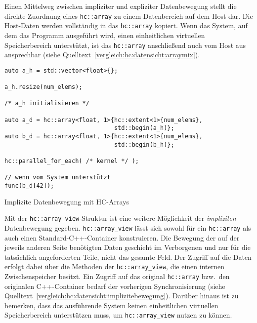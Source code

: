 Einen Mittelweg zwischen impliziter und expliziter Datenbewegung stellt die
direkte Zuordnung eines \texttt{hc::array} zu einem Datenbereich auf dem Host
dar. Die Host-Daten werden vollständig in das \texttt{hc::array} kopiert. Wenn
das System, auf dem das Programm ausgeführt wird, einen einheitlichen virtuellen
Speicherbereich unterstützt, ist das \texttt{hc::array} anschließend auch vom
Host aus ansprechbar (siehe Quelltext~\ref{vergleich:hc:datensicht:arraymix}).

\begin{code}
    \begin{verbatim}
auto a_h = std::vector<float>{};

a_h.resize(num_elems);

/* a_h initialisieren */

auto a_d = hc::array<float, 1>{hc::extent<1>{num_elems},
                               std::begin(a_h)};
auto b_d = hc::array<float, 1>{hc::extent<1>{num_elems},
                               std::begin(b_h)};

hc::parallel_for_each( /* kernel */ );

// wenn vom System unterstützt
func(b_d[42]);
    \end{verbatim}
    \caption{Implizite Datenbewegung mit HC-Arrays}
    \label{vergleich:hc:datensicht:arraymix}
\end{code}

Mit der \texttt{hc::array\_view}-Struktur ist eine weitere Möglichkeit der
\textit{impliziten} Datenbewegung gegeben. \texttt{hc::array\_view} lässt sich 
sowohl für ein \texttt{hc::array} als auch einen Standard-C++-Container
konstruieren. Die Bewegung der auf der jeweils anderen Seite benötigten Daten
geschieht im Verborgenen und nur für die tatsächlich angeforderten Teile, nicht
das gesamte Feld. Der Zugriff auf die Daten erfolgt dabei über die Methoden der
\texttt{hc::array\_view}, die einen internen Zwischenspeicher besitzt. Ein
Zugriff auf das original \texttt{hc::array} bzw.\ den originalen C++-Container
bedarf der vorherigen Synchronisierung (siehe
Quelltext~\ref{vergleich:hc:datensicht:implizitebewegung}). Darüber hinaus ist
zu bemerken, dass das ausführende System keinen einheitlichen virtuellen
Speicherbereich unterstützen muss, um \texttt{hc::array\_view} nutzen zu können.

